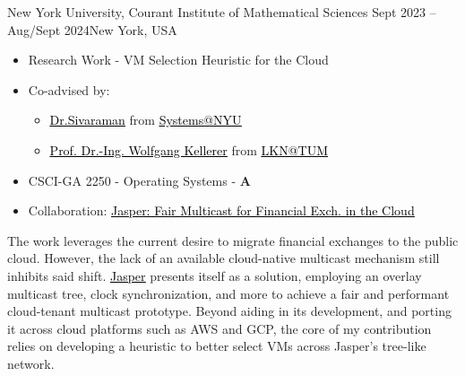 \documentclass[10pt,a4paper,ragged2e,withhyper]{altacv}
\begin{document}
\begin{paracol}{2}

        {New York University, Courant Institute of Mathematical Sciences}
        {Sept 2023 -- Aug/Sept 2024}{New York, USA}
\begin{itemize}
\item Research Work - VM Selection Heuristic for the Cloud    
\item Co-advised by:
    \begin{itemize}
        \item \href{https://anirudhsk.github.io/}{{\textcolor{black}{\underline{Dr.Sivaraman}}}} from \href{https://news.cs.nyu.edu/}{{\textcolor{black}{\underline{Systems@NYU}}}}
        \item \href{https://www.ce.cit.tum.de/en/lkn/team/staff/kellerer-wolfgang/}{{\textcolor{black}{\underline{Prof. Dr.-Ing. Wolfgang Kellerer}}}} from \href{https://www.ce.cit.tum.de/en/lkn/home/}{{\textcolor{black}{\underline{LKN@TUM}}}}
    \end{itemize}
\item CSCI-GA 2250 - Operating Systems - \textbf{A}
\item Collaboration: \href{https://arxiv.org/abs/2402.09527}{{\textcolor{black}{\underline{Jasper: Fair Multicast for Financial Exch. in the Cloud}}}}
\end{itemize}
The work leverages the current desire to migrate financial exchanges to the public cloud. 
However, the lack of an available cloud-native multicast mechanism still inhibits said shift.
\href{https://arxiv.org/abs/2402.09527}{{\textcolor{black}{\underline{Jasper}}}} presents itself as 
a solution, employing an overlay multicast tree, clock synchronization, and more
to achieve a fair and performant cloud-tenant multicast prototype. 
Beyond aiding in its development, and porting it across cloud platforms such as AWS and GCP, 
the core of my contribution relies on developing a heuristic to better select VMs across Jasper's tree-like network.

\end{paracol}
\end{document}
